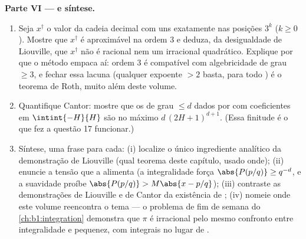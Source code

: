 \begin{problem}
\medskip
\noindent\textbf{Parte VI ---  e síntese.}
\begin{enumerate}
  \item Seja $x^\dagger$ o valor da cadeia decimal com
        uns exatamente nas posições $3^k$ ($k \geq 0$). Mostre que
        $x^\dagger$ é aproximável na ordem $3$ e deduza,
        da desigualdade de Liouville, que $x^\dagger$ não é
        racional nem um irracional quadrático. Explique por que o
        método empaca aí: ordem $3$ é compatível com
        algebricidade de grau $\geq 3$, e fechar essa lacuna
        (qualquer expoente $> 2$ basta, para todo ) é o teorema de Roth, muito além deste volume.
  \item Quantifique Cantor: mostre que os  de
        grau $\leq d$ dados por  com coeficientes
        em $\intint{-H}{H}$ são no máximo $d\,(2H + 1)^{d+1}$.
        (Essa finitude é o que fez a questão 17 funcionar.)
  \item Síntese, uma frase para cada: (i) localize o único
        ingrediente analítico da demonstração de Liouville (qual teorema
        deste capítulo, usado onde); (ii) enuncie a tensão
        que a alimenta (a integralidade força $\abs{P(p/q)} \geq
        q^{-d}$, e a suavidade proíbe $\abs{P(p/q)} > M\abs{x -
        p/q}$); (iii) contraste as demonstrações de Liouville e de
        Cantor da existência de ; (iv) nomeie
        onde este volume reencontra o tema --- o problema de fim de
        semana do \cref{ch:b1:integration} demonstra que $\pi$ é
        irracional pelo mesmo confronto entre integralidade e pequenez,
        com integrais no lugar de .
\end{enumerate}
\end{problem}

